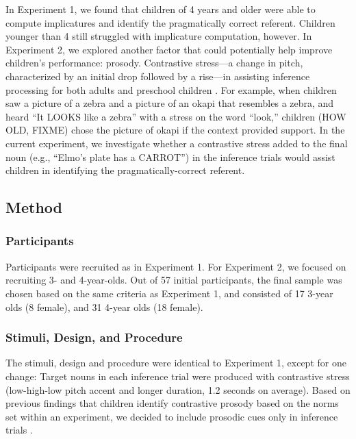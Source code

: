 \documentclass[10pt,letterpaper]{article}
\begin{document}
In Experiment 1, we found that children of 4 years and older were able to compute implicatures and identify the pragmatically correct referent. Children younger than 4 still struggled with implicature computation, however. In Experiment 2, we explored another factor that could potentially help improve children's performance: prosody. Contrastive stress---a change in pitch, characterized by an initial drop followed by a rise---in assisting inference processing for both adults \cite{ito2008anticipatory} and preschool children \cite{kurumada1contextual}. For example, when children saw a picture of a zebra and a picture of an okapi that resembles a zebra, and heard ``It LOOKS like a zebra'' with a stress on the word ``look,'' children (HOW OLD, FIXME) chose the picture of okapi if the context provided support. In the current experiment, we investigate whether a contrastive stress added to the final noun (e.g., ``Elmo's plate has a CARROT'') in the inference trials would assist children in identifying the pragmatically-correct referent.


\subsection{Method}

\subsubsection{Participants}

Participants were recruited as in Experiment 1. For Experiment 2, we focused on recruiting 3- and 4-year-olds. Out of 57 initial participants, the final sample was chosen based on the same criteria as Experiment 1, and consisted of 17 3-year olds (8 female), and 31 4-year olds (18 female).


\subsubsection{Stimuli, Design, and Procedure}

The stimuli, design and procedure were identical to Experiment 1, except for one change: Target nouns in each inference trial were produced with contrastive stress (low-high-low pitch accent and longer duration, 1.2 seconds on average). Based on previous findings that children identify contrastive prosody based on the norms set within an experiment, we decided to include prosodic cues only in inference trials \cite{kurumada1contextual}. 
\end{document}
